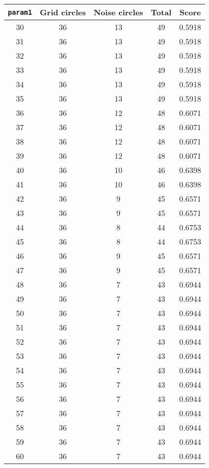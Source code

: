 \documentclass[letterpaper, 12pt]{article}
\begin{document}
\begin{longtable}{|c|c|c|c|c|}
\hline
\textbf{\texttt{param1}} & \textbf{Grid circles} & \textbf{Noise circles} & \textbf{Total} & \textbf{Score} \\
\hline
30 & 36 & 13 & 49 & 0.5918 \\
\hline
31 & 36 & 13 & 49 & 0.5918 \\
\hline
32 & 36 & 13 & 49 & 0.5918 \\
\hline
33 & 36 & 13 & 49 & 0.5918 \\
\hline
34 & 36 & 13 & 49 & 0.5918 \\
\hline
35 & 36 & 13 & 49 & 0.5918 \\
\hline
36 & 36 & 12 & 48 & 0.6071 \\
\hline
37 & 36 & 12 & 48 & 0.6071 \\
\hline
38 & 36 & 12 & 48 & 0.6071 \\
\hline
39 & 36 & 12 & 48 & 0.6071 \\
\hline
40 & 36 & 10 & 46 & 0.6398 \\
\hline
41 & 36 & 10 & 46 & 0.6398 \\
\hline
42 & 36 & 9 & 45 & 0.6571 \\
\hline
43 & 36 & 9 & 45 & 0.6571 \\
\hline
44 & 36 & 8 & 44 & 0.6753 \\
\hline
45 & 36 & 8 & 44 & 0.6753 \\
\hline
46 & 36 & 9 & 45 & 0.6571 \\
\hline
47 & 36 & 9 & 45 & 0.6571 \\
\hline
48 & 36 & 7 & 43 & 0.6944 \\
\hline
49 & 36 & 7 & 43 & 0.6944 \\
\hline
50 & 36 & 7 & 43 & 0.6944 \\
\hline
51 & 36 & 7 & 43 & 0.6944 \\
\hline
52 & 36 & 7 & 43 & 0.6944 \\
\hline
53 & 36 & 7 & 43 & 0.6944 \\
\hline
54 & 36 & 7 & 43 & 0.6944 \\
\hline
55 & 36 & 7 & 43 & 0.6944 \\
\hline
56 & 36 & 7 & 43 & 0.6944 \\
\hline
57 & 36 & 7 & 43 & 0.6944 \\
\hline
58 & 36 & 7 & 43 & 0.6944 \\
\hline
59 & 36 & 7 & 43 & 0.6944 \\
\hline
60 & 36 & 7 & 43 & 0.6944 \\
\hline

\end{longtable}
\end{document}
